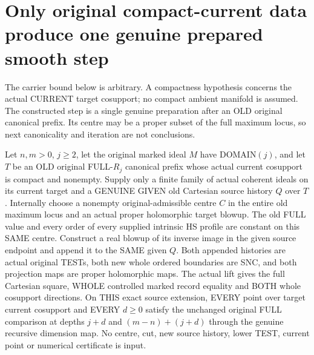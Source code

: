 \section{Only original compact-current data produce one genuine prepared smooth step}

The carrier bound below is arbitrary. A compactness hypothesis concerns the
actual CURRENT target cosupport; no compact ambient manifold is assumed.
The constructed step is a single genuine preparation after an OLD original
canonical prefix. Its centre may be a proper subset of the full maximum
locus, so next canonicality and iteration are not conclusions.

\begin{theorem}
\label{hir:original-compact-prepared-same-source-extension}
\leanok
Let $n,m>0$, $j\geq2$, let the original marked ideal $M$ have
DOMAIN$(j)$, and let $T$ be an OLD original FULL-$R_j$ canonical prefix
whose actual current cosupport is compact and nonempty. Supply only a
finite family of actual coherent ideals on its current target and a
GENUINE GIVEN old Cartesian source history $Q$ over $T$.
Internally choose a nonempty original-admissible centre $C$ in the entire
old maximum locus and an actual proper holomorphic target blowup. The
old FULL value and every order of every supplied intrinsic HS profile are
constant on this SAME centre. Construct a real blowup of its inverse image
in the given source endpoint and append it to the SAME given $Q$.
Both appended histories are actual original TESTs, both new whole ordered
boundaries are SNC, and both projection maps are proper holomorphic maps.
The actual lift gives the full Cartesian square, WHOLE controlled marked
record equality and BOTH whole cosupport directions. On THIS exact source
extension, EVERY point over target current cosupport and EVERY $d\geq0$
satisfy the unchanged original FULL comparison at depths $j+d$ and
$(m-n)+(j+d)$ through the genuine recursive dimension map. No centre,
cut, new source history, lower TEST, current point or numerical certificate
is input.
\end{theorem}
